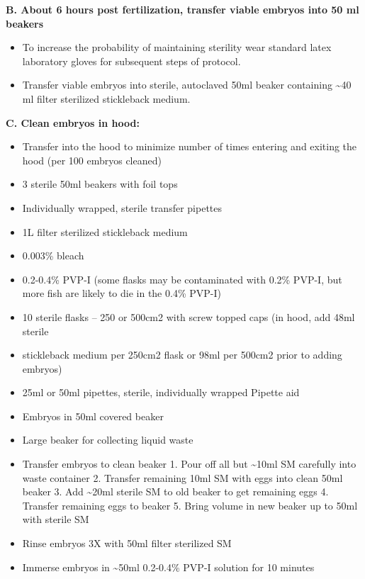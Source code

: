 \documentclass[
]{book}
\providecommand{\tightlist}{%
  \setlength{\itemsep}{0pt}\setlength{\parskip}{0pt}}
\begin{document}
\textbf{B. About 6 hours post fertilization, transfer viable embryos into 50 ml beakers}

\begin{itemize}
\tightlist
\item
  To increase the probability of maintaining sterility wear standard latex laboratory gloves for subsequent steps of protocol.
\item
  Transfer viable embryos into sterile, autoclaved 50ml beaker containing \textasciitilde40 ml filter sterilized stickleback medium.
\end{itemize}

\textbf{C. Clean embryos in hood:}

\begin{itemize}
\tightlist
\item
  Transfer into the hood to minimize number of times entering and exiting the hood (per 100 embryos cleaned)
\item
  3 sterile 50ml beakers with foil tops
\item
  Individually wrapped, sterile transfer pipettes
\item
  1L filter sterilized stickleback medium
\item
  0.003\% bleach
\item
  0.2-0.4\% PVP-I (some flasks may be contaminated with 0.2\% PVP-I, but more fish are likely to die in the 0.4\% PVP-I)
\item
  10 sterile flasks -- 250 or 500cm2 with screw topped caps (in hood, add 48ml sterile
\item
  stickleback medium per 250cm2 flask or 98ml per 500cm2 prior to adding embryos)
\item
  25ml or 50ml pipettes, sterile, individually wrapped Pipette aid
\item
  Embryos in 50ml covered beaker
\item
  Large beaker for collecting liquid waste
\item
  Transfer embryos to clean beaker
  1. Pour off all but \textasciitilde10ml SM carefully into waste container
  2. Transfer remaining 10ml SM with eggs into clean 50ml beaker
  3. Add \textasciitilde20ml sterile SM to old beaker to get remaining eggs
  4. Transfer remaining eggs to beaker
  5. Bring volume in new beaker up to 50ml with sterile SM
\item
  Rinse embryos 3X with 50ml filter sterilized SM
\item
  Immerse embryos in \textasciitilde50ml 0.2-0.4\% PVP-I solution for 10 minutes

\end{itemize}
\end{document}
